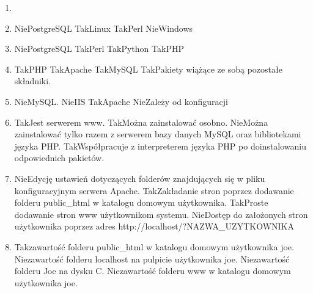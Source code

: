 \begin{enumerate}
		\item {}
		
		\item {}%
			{Nie}{PostgreSQL}%
			{Tak}{Linux}%
			{Tak}{Perl}%
			{Nie}{Windows}
		
		\newpage
		\item {}%
			{Nie}{PostgreSQL}%
			{Tak}{Perl}%
			{Tak}{Python}%
			{Tak}{PHP}
				
		\item {}%
			{Tak}{PHP}%
			{Tak}{Apache}%
			{Tak}{MySQL}%
			{Tak}{Pakiety wiążące ze sobą pozostałe składniki.}%
			
		\item {}%
			{Nie}{MySQL.}%
			{Nie}{IIS}%
			{Tak}{Apache}%
			{Nie}{Zależy od konfiguracji}
			
		\item {}%
			{Tak}{Jest serwerem www.}%
			{Tak}{Można zainstalować osobno.}%
			{Nie}{Można zainstalować tylko razem z serwerem bazy danych MySQL oraz bibliotekami języka PHP.}%
			{Tak}{Współpracuje z interpreterem języka PHP po doinstalowaniu odpowiednich pakietów.}
			
		\item {}%
			{Nie}{Edycję ustawień dotyczących folderów znajdujących się w pliku konfiguracyjnym serwera Apache.}%
			{Tak}{Zakładanie stron poprzez dodawanie folderu public\_html w katalogu domowym użytkownika.}%
			{Tak}{Proste dodawanie stron www użytkownikom systemu.}%
			{Nie}{Dostęp do założonych stron użytkownika poprzez adres http://localhost/?NAZWA\_UZYTKOWNIKA}
		
		\item {}%
			{Tak}{zawartość folderu public\_html w katalogu domowym użytkownika joe.}%
			{Nie}{zawartość folderu localhost na pulpicie użytkownika joe.}%
			{Nie}{zawartość folderu Joe na dysku C.}%
			{Nie}{zawartość folderu www w katalogu domowym użytkownika joe.}
			

\end{enumerate}
